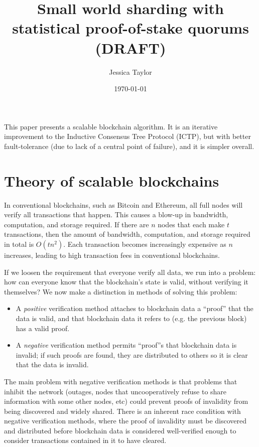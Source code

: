 \documentclass{article}
\title{Small world sharding with statistical proof-of-stake quorums (DRAFT)}
\date{\today}
\author{Jessica Taylor}
\begin{document}
\maketitle

This paper presents a scalable blockchain algorithm.  It is an iterative improvement to the Inductive Consensus Tree Protocol (ICTP), but with better fault-tolerance (due to lack of a central point of failure), and it is simpler overall.

\section{Theory of scalable blockchains}

In conventional blockchains, such as Bitcoin and Ethereum, all full nodes will verify all transactions that happen.  This causes a blow-up in bandwidth, computation, and storage required.
If there are $n$ nodes that each make $t$ transactions, then the amount of bandwidth, computation, and storage required in total is $O(tn^2)$.  Each transaction becomes increasingly expensive
as $n$ increases, leading to high transaction fees in conventional blockchains.

If we loosen the requirement that everyone verify all data, we run into a problem: how can everyone know that the blockchain's state is valid, without verifying it themselves?
We now make a distinction in methods of solving this problem:

\begin{itemize}
  \item A \emph{positive} verification method attaches to blockchain data a ``proof'' that the data is valid, and that blockchain data it refers to (e.g. the previous block) has a valid proof.
  \item A \emph{negative} verification method permits ``proof''s that blockchain data is invalid; if such proofs are found, they are distributed to others so it is clear that the data is invalid.
\end{itemize}

The main problem with negative verification methods is that problems that inhibit the network (outages, nodes that uncooperatively refuse to share information with some other nodes, etc)
could prevent proofs of invalidity from being discovered and widely shared.  There is an inherent race condition with negative verification methods, where the proof of invalidity must be
discovered and distributed before blockchain data is considered well-verified enough to consider transactions contained in it to have cleared.
\end{document}
